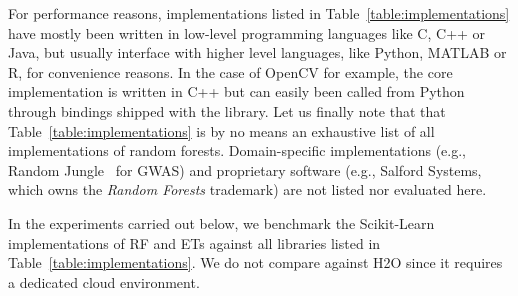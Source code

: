 For performance reasons, implementations listed in
Table~\ref{table:implementations} have mostly been written in low-level
programming languages like C, C++ or Java, but usually interface with higher
level languages, like Python, MATLAB or R, for convenience reasons. In the case
of OpenCV for example, the core implementation is written in C++ but can easily
been called from Python through bindings shipped with the library. Let us
finally note that that Table~\ref{table:implementations} is by no means an
exhaustive list of all implementations of random forests. Domain-specific
implementations (e.g., Random Jungle~\citep{schwarz:2010} for GWAS) and
proprietary software (e.g., Salford Systems, which owns the
\textit{Random Forests} trademark) are not listed nor evaluated here.

In the experiments carried out below, we benchmark the Scikit-Learn
implementations of RF and ETs against all libraries listed in
Table~\ref{table:implementations}. We do not compare against H2O since it
requires a dedicated cloud environment. 







